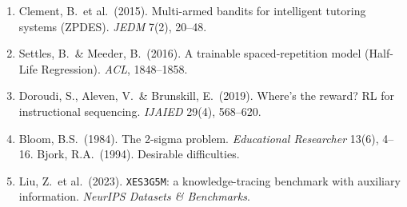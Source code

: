 \documentclass[11pt]{article}
\begin{document}
\begin{enumerate}[leftmargin=1.5em,itemsep=0pt]
\item Clement, B.\ et al.\ (2015). Multi-armed bandits for intelligent tutoring systems (ZPDES). \emph{JEDM} 7(2), 20--48.
\item Settles, B.\ \& Meeder, B.\ (2016). A trainable spaced-repetition model (Half-Life Regression). \emph{ACL}, 1848--1858.
\item Doroudi, S., Aleven, V.\ \& Brunskill, E.\ (2019). Where's the reward? RL for instructional sequencing. \emph{IJAIED} 29(4), 568--620.
\item Bloom, B.S.\ (1984). The 2-sigma problem. \emph{Educational Researcher} 13(6), 4--16. \; Bjork, R.A.\ (1994). Desirable difficulties.
\item Liu, Z.\ et al.\ (2023). \texttt{XES3G5M}: a knowledge-tracing benchmark with auxiliary information. \emph{NeurIPS Datasets \& Benchmarks}.
\end{enumerate}
\end{document}
